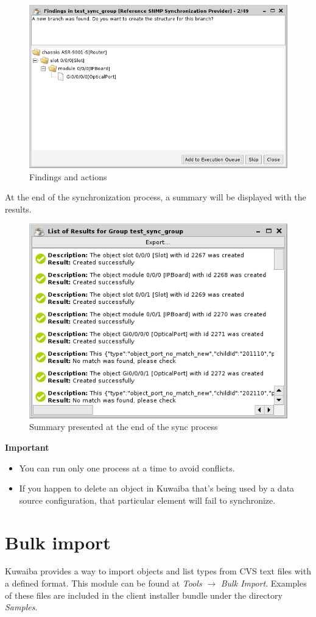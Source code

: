 \documentclass[a4paper]{article}
\begin{document}
			\begin{figure}[h!]
				\centering
				\includegraphics[width=0.6\linewidth]{img/sync_possible_actions_2.png}
				\caption{Findings and actions}
				\label{fig:sync_possible_actions_2}
			\end{figure}
		
			At the end of the synchronization process, a summary will be displayed with the results.\\
			
			\begin{figure}[h!]
				\centering
				\includegraphics[width=0.5\linewidth]{img/sync_results.png}
				\caption{Summary presented at the end of the sync process}
				\label{fig:sync_results}
			\end{figure}
		    
		    \begin{framed} {\large \textbf{Important}}
		    	\begin{itemize}
		    		\item You can run only one process at a time to avoid conflicts. 
		    		\item If you happen to delete an object in Kuwaiba that's being used by a data source configuration, that particular element will fail to synchronize.
		    	\end{itemize}
		    \end{framed}	
		\clearpage
		\section{Bulk import}\label{sec:bulk_import}
			Kuwaiba  provides a  way  to  import  objects  and  list  types  from CVS text files with a defined format.  This  module  can be  found at \textit{Tools} $\rightarrow$ \textit{Bulk Import}. Examples of these files are included in the client installer bundle under the directory \textit{Samples}.
\end{document}
